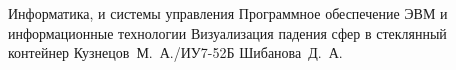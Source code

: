 \documentclass{bmstu}
\begin{document}
\makecourseworktitle
    {Информатика, и системы управления} %
    {Программное обеспечение ЭВМ и информационные технологии} %
    {Визуализация падения сфер в стеклянный контейнер} %
    {Кузнецов~М.~А./ИУ7-52Б} %
    {Шибанова~Д.~А.} %
    {}

\maketableofcontents











\makebibliography


\end{document}
